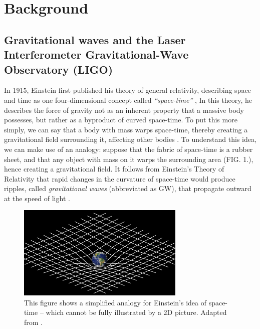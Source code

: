 \documentclass[preprint,
letterpaper,
 amsmath,amssymb,
 aps,
]{revtex4-2}
\begin{document}
\section{Background}
\subsection{Gravitational waves and the Laser Interferometer Gravitational-Wave Observatory (LIGO)}
In 1915, Einstein first published his theory of general relativity, describing space and time as one four-dimensional concept called \textit{``space-time''} \cite{maggiore_2008}, In this theory, he describes the force of gravity not as an inherent property that a massive body possesses, but rather as a byproduct of curved space-time. To put this more simply, we can say that a body with mass warps space-time, thereby creating a gravitational field surrounding it, affecting other bodies \cite{carlip}. To understand this idea, we can make use of an analogy: suppose that the fabric of space-time is a rubber sheet, and that any object with mass on it warps the surrounding area (FIG. 1.), hence creating a gravitational field. It follows from Einstein's Theory of Relativity that rapid changes in the curvature of space-time would produce ripples, called \textit{gravitational waves} (abbreviated as GW), that propagate outward at the speed of light  \cite{JSTORLIGO}.

\begin{figure}[t]
\includegraphics[width=8cm]{genral.png}
\caption{This figure shows a simplified analogy for Einstein's idea of space-time – which cannot be fully illustrated by a 2D picture. Adapted from \cite{mattson}.}
\centering
\end{figure}
\end{document}
